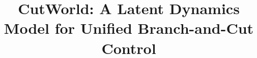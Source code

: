 \documentclass{article}
\title{CutWorld: A Latent Dynamics Model for Unified Branch-and-Cut Control}
\begin{document}
\maketitle

\begin{abstract}


\end{abstract}
\end{document}
